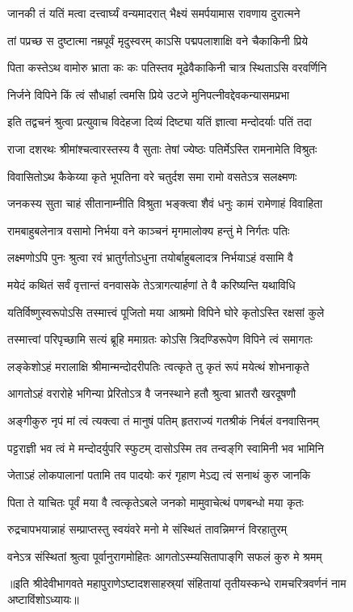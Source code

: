 \twolineshloka
{जानकी तं यतिं मत्वा दत्त्वार्घ्यं वन्यमादरात्}
{भैक्ष्यं समर्पयामास रावणाय दुरात्मने}%

\twolineshloka
{तां पप्रच्छ स दुष्टात्मा नम्रपूर्वं मृदुस्वरम्}
{काऽसि पद्मपलाशाक्षि वने चैकाकिनी प्रिये}%

\twolineshloka
{पिता कस्तेऽथ वामोरु भ्राता कः कः पतिस्तव}
{मूढेवैकाकिनी चात्र स्थिताऽसि वरवर्णिनि}%

\twolineshloka
{निर्जने विपिने किं त्वं सौधार्हा त्वमसि प्रिये}
{उटजे मुनिपत्‍नीवद्देवकन्यासमप्रभा}%



\twolineshloka
{इति तद्वचनं श्रुत्वा प्रत्युवाच विदेहजा}
{दिव्यं दिष्ट्या यतिं ज्ञात्वा मन्दोदर्याः पतिं तदा}%

\twolineshloka
{राजा दशरथः श्रीमांश्चत्वारस्तस्य वै सुताः}
{तेषां ज्येष्ठः पतिर्मेऽस्ति रामनामेति विश्रुतः}%

\twolineshloka
{विवासितोऽथ कैकेय्या कृते भूपतिना वरे}
{चतुर्दश समा रामो वसतेऽत्र सलक्ष्मणः}%

\twolineshloka
{जनकस्य सुता चाहं सीतानाम्नीति विश्रुता}
{भङ्क्त्वा शैवं धनुः कामं रामेणाहं विवाहिता}%

\twolineshloka
{रामबाहुबलेनात्र वसामो निर्भया वने}
{काञ्चनं मृगमालोक्य हन्तुं मे निर्गतः पतिः}%

\twolineshloka
{लक्ष्मणोऽपि पुनः श्रुत्वा रवं भ्रातुर्गतोऽधुना}
{तयोर्बाहुबलादत्र निर्भयाऽहं वसामि वै}%

\twolineshloka
{मयेदं कथितं सर्वं वृत्तान्तं वनवासके}
{तेऽत्रागत्यार्हणां ते वै करिष्यन्ति यथाविधि}%

\twolineshloka
{यतिर्विष्णुस्वरूपोऽसि तस्मात्त्वं पूजितो मया}
{आश्रमो विपिने घोरे कृतोऽस्ति रक्षसां कुले}%

\twolineshloka
{तस्मात्त्वां परिपृच्छामि सत्यं ब्रूहि ममाग्रतः}
{कोऽसि त्रिदण्डिरूपेण विपिने त्वं समागतः}%




\twolineshloka
{लङ्केशोऽहं मरालाक्षि श्रीमान्मन्दोदरीपतिः}
{त्वत्कृते तु कृतं रूपं मयेत्थं शोभनाकृते}%

\twolineshloka
{आगतोऽहं वरारोहे भगिन्या प्रेरितोऽत्र वै}
{जनस्थाने हतौ श्रुत्वा भ्रातरौ खरदूषणौ}%

\twolineshloka
{अङ्गीकुरु नृपं मां त्वं त्यक्त्वा तं मानुषं पतिम्}
{हृतराज्यं गतश्रीकं निर्बलं वनवासिनम्}%

\twolineshloka
{पट्टराज्ञी भव त्वं मे मन्दोदर्युपरि स्फुटम्}
{दासोऽस्मि तव तन्वङ्‌गि स्वामिनी भव भामिनि}%

\twolineshloka
{जेताऽहं लोकपालानां पतामि तव पादयोः}
{करं गृहाण मेऽद्य त्वं सनाथं कुरु जानकि}%

\twolineshloka
{पिता ते याचितः पूर्वं मया वै त्वत्कृतेऽबले}
{जनको मामुवाचेत्थं पणबन्धो मया कृतः}%

\twolineshloka
{रुद्रचापभयान्नाहं सम्प्राप्तस्तु स्वयंवरे}
{मनो मे संस्थितं तावन्निमग्नं विरहातुरम्}%

\twolineshloka
{वनेऽत्र संस्थितां श्रुत्वा पूर्वानुरागमोहितः}
{आगतोऽस्म्यसितापाङ्‌गि सफलं कुरु मे श्रमम्}%


॥इति श्रीदेवीभागवते महापुराणेऽष्टादशसाहस्र्यां संहितायां तृतीयस्कन्धे रामचरित्रवर्णनं नाम अष्टाविंशोऽध्यायः॥
